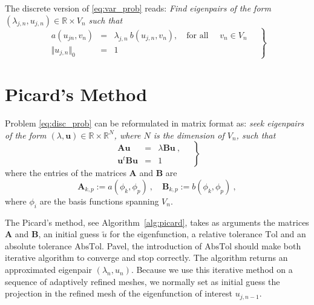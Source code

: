 \documentclass[preprint,12pt]{elsarticle}
\begin{document}

The discrete version of \eqref{eq:var_prob} reads:
\emph{Find eigenpairs of the form $(\lambda_{j,n},u_{j,n})\in
\mathbb{R}\times V_n$
such that}
\begin{equation}
\label{eq:disc_prob}
\left.
\begin{array}{lcl}
a(u_{jn},v_{n})&=& \lambda_{j,n}\ b(u_{j,n},v_{n}),
\quad \text{for all } \quad v_{n}  \in V_n\\
 \Vert u_{j,n} \Vert_{0} &=& 1
\end{array}\quad
\right\}
\end{equation}


\section{Picard's Method}\label{sec:picard}

Problem \eqref{eq:disc_prob} can be reformulated in matrix format as:
\emph{seek eigenpairs of the form $(\lambda,\mathbf{u})\in
\mathbb{R}\times \mathbb{R}^N$, where $N$ is the dimension of $V_n$,
such that}
\begin{equation}
\label{eq:disc_prob_mat}
\left.
\begin{array}{lcl}
\mathbf{A} \mathbf{u}&=& \lambda\mathbf{B}\mathbf{u}\ ,
\\
\mathbf{u}^t\mathbf{B} \mathbf{u} &=& 1
\end{array}\quad
\right\}
\end{equation}
where the entries of the matrices $\mathbf{A}$ and $\mathbf{B}$ are 
$$
\mathbf{A}_{k,p}:=a(\phi_k,\phi_p)\ ,\quad\mathbf{B}_{k,p}:=b(\phi_k,\phi_p)\ ,
$$
where $\phi_i$ are the basis functions spanning $V_n$.

The Picard's method, see Algorithm~\ref{alg:picard}, takes as arguments the matrices $\mathbf{A}$ and $\mathbf{B}$, an initial guess $\tilde u$ for the eigenfunction, a relative tolerance $\mathrm{Tol}$ and an absolute tolerance $\mathrm{AbsTol}$. {\red Pavel, the introduction of $\mathrm{AbsTol}$ should make both iterative algorithm to converge and stop correctly.} The algorithm returns an approximated eigenpair $(\lambda_{n},u_{n})$.
Because we use this iterative method on a sequence of adaptively refined meshes, we normally set as initial guess
the projection in the refined mesh of the eigenfunction of interest $u_{j,n-1}$.
\end{document}
